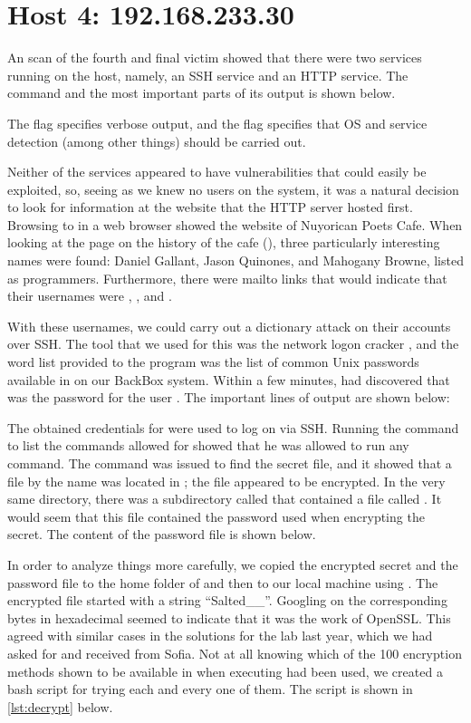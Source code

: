 \section*{Host 4: 192.168.233.30}
An  scan of the fourth and final victim showed that there were two services running on the host, namely, an SSH service and an HTTP service. The command and the most important parts of its output is shown below.

The  flag specifies verbose output, and the  flag specifies that OS and service detection (among other things) should be carried out.

Neither of the services appeared to have vulnerabilities that could easily be exploited, so, seeing as we knew no users on the system, it was a natural decision to look for information at the website that the HTTP server hosted first. Browsing to  in a web browser showed the website of Nuyorican Poets Cafe. When looking at the page on the history of the cafe (), three particularly interesting names were found: Daniel Gallant, Jason Quinones, and Mahogany Browne, listed as programmers. Furthermore, there were mailto links that would indicate that their usernames were , , and .

With these usernames, we could carry out a dictionary attack on their accounts over SSH. The tool that we used for this was the network logon cracker \cite{hydra}, and the word list provided to the program was the list of common Unix passwords available in  on our BackBox system. Within a few minutes,  had discovered that  was the password for the user . The important lines of output are shown below:

The obtained credentials for  were used to log on via SSH. Running the command  to list the commands allowed for  showed that he was allowed to run any command. The command  was issued to find the secret file, and it showed that a file by the name  was located in ; the file appeared to be encrypted. In the very same directory, there was a subdirectory called  that contained a file called . It would seem that this file contained the password used when encrypting the secret. The content of the password file is shown below.

In order to analyze things more carefully, we copied the encrypted secret and the password file to the home folder of  and then to our local machine using . The encrypted file started with a string ``Salted\_\_''. Googling on the corresponding bytes in hexadecimal seemed to indicate that it was the work of OpenSSL. This agreed with similar cases in the solutions for the lab last year, which we had asked for and received from Sofia. Not at all knowing which of the 100 encryption methods shown to be available in  when executing  had been used, we created a bash script for trying each and every one of them. The script is shown in \autoref{lst:decrypt} below.

